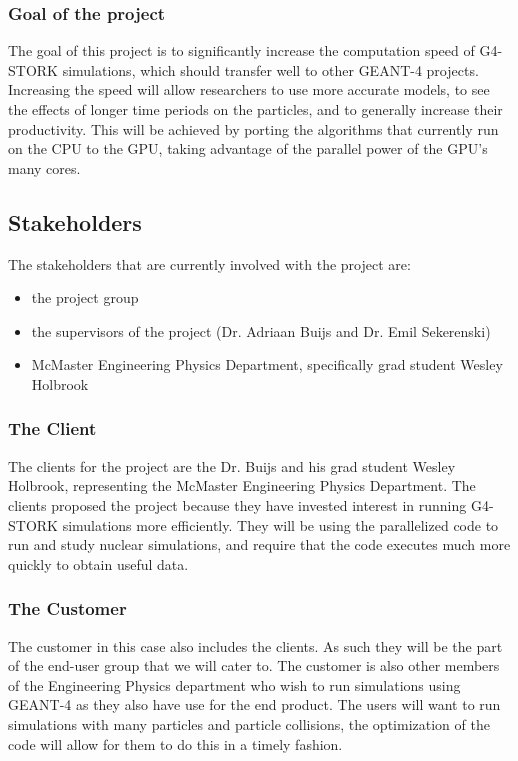 \documentclass[12pt]{article}
\begin{document}
\subsubsection{Goal of the project}
The goal of this project is to significantly increase the computation speed of G4-STORK simulations, which should transfer well to other GEANT-4 projects. Increasing the speed will allow researchers to use more accurate models, to see the effects of longer time periods on the particles, and to generally increase their productivity. This will be achieved by porting the algorithms that currently run on the CPU to the GPU, taking advantage of the parallel power of the GPU's many cores.

\subsection{Stakeholders}\label{SubSec_Stakeholders} %
The stakeholders that are currently involved with the project are:
\begin{itemize}
\item the project group
\item the supervisors of the project (Dr. Adriaan Buijs and Dr. Emil Sekerenski)
\item McMaster Engineering Physics Department, specifically grad student Wesley Holbrook
\end{itemize}

\subsubsection{The Client}
The clients for the project are the Dr. Buijs and his grad student Wesley Holbrook, representing the McMaster Engineering Physics Department. The clients proposed the project because they have invested interest in running G4-STORK simulations more efficiently. They will be using the parallelized code to run and study nuclear simulations, and require that the code executes much more quickly to obtain useful data.
	
\subsubsection{The Customer}
The customer in this case also includes the clients. As such they will be the part of the end-user group that we will cater to.
The customer is also other members of the Engineering Physics department who wish to run simulations using GEANT-4 as they also have use for the end product. The users will want to run simulations with many particles and particle collisions, the optimization of the code will allow for them to do this in a timely fashion.
	
\end{document}
